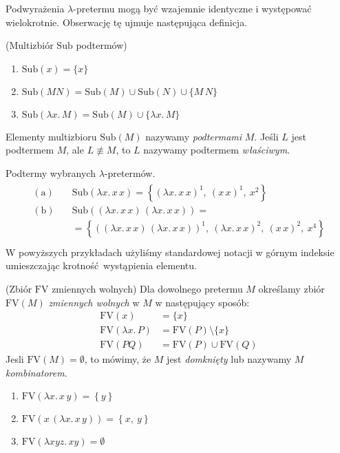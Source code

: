 Podwyrażenia \(\lambda\)-pretermu mogą być wzajemnie identyczne i występować wielokrotnie. Obserwację tę ujmuje następująca definicja.
\begin{definicja}(Multizbiór \(\mathrm{Sub}\) podtermów)
  \begin{enumerate}[label={(\arabic*)}, ref={(\arabic*)}]
    \setlength\itemsep{0em}
    \item \(\mathrm{Sub}(x)=\{x\}\) 
    \item \(\mathrm{Sub}(MN)=\mathrm{Sub}(M)\cup\mathrm{Sub}(N)\cup\{M\,N\}\)
    \item \(\mathrm{Sub}(\lambda x.\, M) = \mathrm{Sub}(M)\cup \{\lambda x.\, M\}\)  
  \end{enumerate}
  Elementy multizbioru \(\mathrm{Sub}(M)\) nazywamy \emph{podtermami} \(M\). Jeśli \(L\) jest podtermem \(M\), ale \(L\not\equiv M\), to \(L\) nazywamy podtermem \emph{właściwym}.
\end{definicja}
\begin{przyklad} Podtermy wybranych \(\lambda\)-pretermów.
  \begin{align*}
    \begin{split}
      \mathrm{(a)}\quad & \mathrm{Sub}\left(\lambda x.\,x\, x\right)=\left\{\left(\lambda x.\,x\, x\right)^1,\  \left(x\, x\right)^1,\ x^2\right\}\\
       \mathrm{(b)}\quad & \mathrm{Sub}\left(\left(\lambda x .\, x\, x\right)\,\left(\lambda x .\, x\, x\right)\right) = \\
    & = \left\{((\lambda x .\, x\, x)\,(\lambda x .\, x\, x))^{1}, \ (\lambda x .\, x\, x)^2,\ (x\,x)^{2},\ x^{4}\right\}\\
  \end{split}     
  \end{align*}
  W powyższych przykładach użyliśmy standardowej notacji w górnym indeksie umieszczając krotność wystąpienia elementu.
\end{przyklad}
\begin{definicja}(Zbiór \(\mathrm{FV}\) zmiennych wolnych)
  Dla dowolnego pretermu \(M\) określamy zbiór \(\mathrm{FV}(M)\) \emph{zmiennych wolnych} w \(M\) w następujący sposób:
\begin{align*}
    \mathrm{FV}(x) &= \{x\}\\
    \mathrm{FV}(\lambda x .\, P)  &= \mathrm{FV}(P)\setminus\{x\}\\
    \mathrm{FV}(P Q) &= \mathrm{FV}(P)\cup\mathrm{FV}(Q)
\end{align*}
  Jesli \(\mathrm{FV}(M)=\emptyset\), to mówimy, że \(M\) jest \emph{domknięty} lub nazywamy \(M\) \emph{kombinatorem}.
\end{definicja}
\begin{przyklad}
  \begin{enumerate}[label=(\alph*)]
    \setlength\itemsep{0em}
    \item \(\mathrm{FV}(\lambda x.\,x\,y)=\left\{y\right\}\)
    \item \(\mathrm{FV}(x\,(\lambda x.\, x\,y)) = \left\{x,\ y\right\}\)
    \item \(\mathrm{FV}(\lambda x y z.\, x y) = \emptyset\)  
  \end{enumerate}
\end{przyklad}

